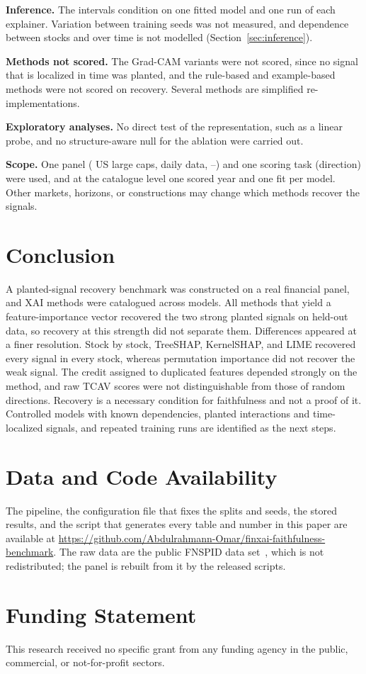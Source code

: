 \documentclass[conference]{IEEEtran}
\begin{document}
\textbf{Inference.} The intervals condition on one fitted model and one run
of each explainer. Variation between training seeds was not measured, and
dependence between stocks and over time is not modelled
(Section~\ref{sec:inference}).

\textbf{Methods not scored.} The Grad-CAM variants were not scored, since no
signal that is localized in time was planted, and the rule-based and
example-based methods were not scored on recovery. Several methods are
simplified re-implementations.

\textbf{Exploratory analyses.} No direct test of the representation, such as
a linear probe, and no structure-aware null for the ablation were carried
out.

\textbf{Scope.} One panel (\nTickers{} US large caps, daily data,
\dateMin--\dateMax) and one scoring task (direction) were used, and at the
catalogue level one scored year and one fit per model. Other markets,
horizons, or constructions may change which methods recover the signals.

\section{Conclusion}
A planted-signal recovery benchmark was constructed on a real financial
panel, and \nXaiMethodsCatalogued{} XAI methods were catalogued across
\nModelsZoo{} models. All \nXaiNativeScored{} methods that yield a
feature-importance vector recovered the two strong planted signals on
held-out data, so recovery at this strength did not separate them.
Differences appeared at a finer resolution. Stock by stock, TreeSHAP,
KernelSHAP, and LIME recovered every signal in every stock, whereas
permutation importance did not recover the weak signal. The credit assigned
to duplicated features depended strongly on the method, and raw TCAV scores
were not distinguishable from those of random directions. Recovery is a
necessary condition for faithfulness and not a proof of it. Controlled
models with known dependencies, planted interactions and time-localized
signals, and repeated training runs are identified as the next steps.

\section*{Data and Code Availability}
The pipeline, the configuration file that fixes the splits and seeds, the
stored results, and the script that generates every table and number in this
paper are available at
\url{https://github.com/Abdulrahmann-Omar/finxai-faithfulness-benchmark}.
The raw data are the public FNSPID data set~\cite{dong2024fnspid}, which is
not redistributed; the panel is rebuilt from it by the released scripts.

\section*{Funding Statement}
This research received no specific grant from any funding agency in the
public, commercial, or not-for-profit sectors.



\end{document}
